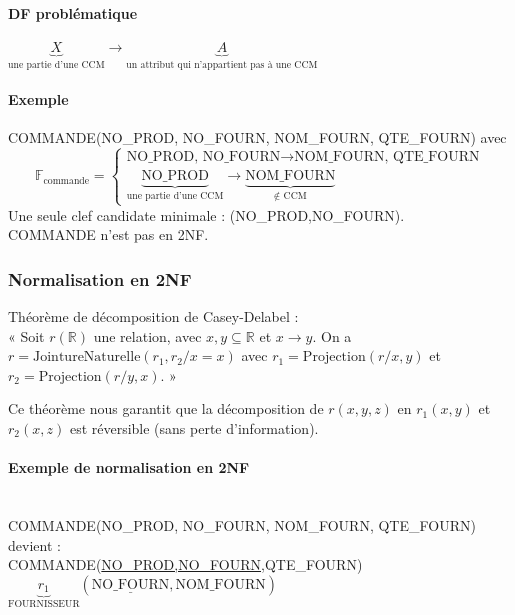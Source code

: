 \documentclass[10pt]{article}
\begin{document}
            \paragraph{DF problématique} $\underbrace{X}_{\text{une partie d'une CCM}} \rightarrow \underbrace{A}_{\text{un attribut qui n'appartient pas à une CCM}}$

            \paragraph{Exemple} COMMANDE(NO\_PROD, NO\_FOURN, NOM\_FOURN, QTE\_FOURN) avec
            $$\mathbb{F}_{\text{commande}} = \left\{\begin{array}{l}
                \text{NO\_PROD, NO\_FOURN} \rightarrow \text{NOM\_FOURN, QTE\_FOURN} \\
                \underbrace{\text{NO\_PROD}}_{\text{une partie d'une CCM}} \rightarrow \underbrace{\text{NOM\_FOURN}}_{\notin\text{ CCM}}
            \end{array}\right.$$
            Une seule clef candidate minimale : (NO\_PROD,NO\_FOURN).\\
            COMMANDE n'est pas en 2NF.

            \subsubsection{Normalisation en 2NF}
                Théorème de décomposition de Casey-Delabel :\\
                « Soit $r(\mathbb{R})$ une relation, avec $x,y\subseteq\mathbb{R}$ et $x\rightarrow y$. On a $r=\mathrm{JointureNaturelle}(r_1,r_2/x=x)$ avec $r_1=\mathrm{Projection}(r/x,y)$ et $r_2=\mathrm{Projection}(r/y,x)$. »

                Ce théorème nous garantit que la décomposition de $r(x,y,z)$ en $r_1(x,y)$ et $r_2(x,z)$ est réversible (sans perte d'information).

                \paragraph{Exemple de normalisation en 2NF}~\\
                COMMANDE(NO\_PROD, NO\_FOURN, NOM\_FOURN, QTE\_FOURN) devient :\\
                COMMANDE(\underline{NO\_PROD,NO\_FOURN},QTE\_FOURN)\\
                $\underbrace{r_1}_{\text{FOURNISSEUR}}(\underline{\text{NO\_FOURN}},\text{NOM\_FOURN})$\\
\end{document}
